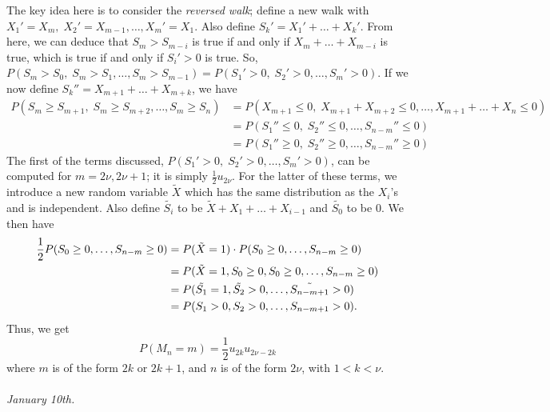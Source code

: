 \documentclass[15pt,a4paper]{book}
\theoremstyle{definition}
\newcommand{\eax}[1]{\emph{#1}\index{#1}} %
\begin{document}
The key idea here is to consider the \eax{reversed walk}; define a new walk with $X_{1}'=X_{m},\; X_{2}'=X_{m-1},\ldots,X_{m}'=X_{1}$. Also define $S_{k}' = X_{1}' + \ldots + X_{k}'$. From here, we can deduce that $S_{m}>S_{m-i}$ is true if and only if $X_{m}+\ldots+X_{m-i}$ is true, which is true if and only if $S_{i}'>0$ is true. So, $P(S_{m}>S_{0},\; S_{m}>S_{1},\ldots,S_{m}>S_{m-1}) = P(S_{1}'>0,\; S_{2}'>0, \ldots, S_{m}'>0)$. If we now define $S_{k}''=X_{m+1}+\ldots+X_{m+k}$, we have
\begin{align*}
    P(S_{m} \geq S_{m+1},\; S_{m} \geq S_{m+2}, \ldots, S_{m} \geq S_{n}) &= P(X_{m+1}\leq 0,\; X_{m+1}+X_{m+2}\leq 0, \ldots, X_{m+1}+\ldots+X_{n}\leq 0) \\
    &= P(S_{1}''\leq 0,\; S_{2}''\leq 0,\ldots,S_{n-m}''\leq 0) \\
    &= P(S_{1}''\geq 0,\; S_{2}''\geq 0,\ldots,S_{n-m}''\geq 0)
\end{align*}
The first of the terms discussed, $P(S_{1}'>0,\; S_{2}'>0, \ldots, S_{m}'>0)$, can be computed for $m = 2\nu, 2\nu+1$; it is simply $\frac{1}{2}u_{2\nu}$. For the latter of these terms, we introduce a new random variable $\tilde{X}$ which has the same distribution as the $X_{i}$'s and is independent. Also define $\tilde{S_{i}}$ to be $\tilde{X}+X_{1}+\ldots+X_{i-1}$ and $\tilde{S_{0}}$ to be $0$. We then have
\begin{align}
    \frac{1}{2}P(S_{0} \geq 0, \ldots, S_{n-m} \geq 0) &= P(\tilde{X}=1) \cdot P(S_{0} \geq 0, \ldots, S_{n-m} \geq 0) \notag\\
    &= P(\tilde{X}=1,S_{0} \geq 0, S_{0} \geq 0, \ldots, S_{n-m} \geq 0) \notag\\
    &= P(\tilde{S_{1}}=1,\tilde{S_{2}}>0,\ldots,\tilde{S_{n-m+1}}>0) \notag\\
    &= P(S_{1}>0,S_{2}>0,\ldots,S_{n-m+1}>0).
\end{align}
Thus, we get
\begin{equation}
    P(M_{n}=m) = \frac{1}{2} u_{2k}u_{2\nu-2k}
\end{equation}
where $m$ is of the form $2k$ or $2k+1$, and $n$ is of the form $2\nu$, with $1 < k < \nu$.\\ \\
\textit{January 10th.}
\end{document}
